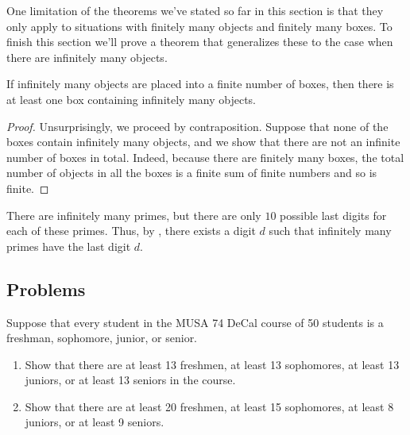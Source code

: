 \documentclass[../main.tex]{subfiles}
\begin{document}
One limitation of the theorems we've stated so far in this section is that they only apply to situations with finitely many objects and finitely many boxes. To finish this section we'll prove a theorem that generalizes these to the case when there are infinitely many objects.
\begin{theorem} \label{thm:inf-pigenhole}
    If infinitely many objects are placed into a finite number of boxes, then there is at least one box containing infinitely many objects.
\end{theorem}
\begin{proof}
    Unsurprisingly, we proceed by contraposition. Suppose that none of the boxes contain infinitely many objects, and we show that there are not an infinite number of boxes in total. Indeed, because there are finitely many boxes, the total number of objects in all the boxes is a finite sum of finite numbers and so is finite.
\end{proof}
\begin{example}
    There are infinitely many primes, but there are only $10$ possible last digits for each of these primes. Thus, by , there exists a digit $d$ such that infinitely many primes have the last digit $d$.
\end{example}

\subsection{Problems}
\begin{homework}
    Suppose that every student in the MUSA 74 DeCal course of 50 students is a freshman, sophomore, junior, or senior. 
    \begin{enumerate}[label=(\alph*)]
        \item Show that there are at least 13 freshmen, at least 13 sophomores, at least 13 juniors, or at least 13 seniors in the course.
        \item Show that there are at least 20 freshmen, at least 15 sophomores, at least 8 juniors, or at least 9 seniors.  
    \end{enumerate}
\end{homework}
\end{document}
